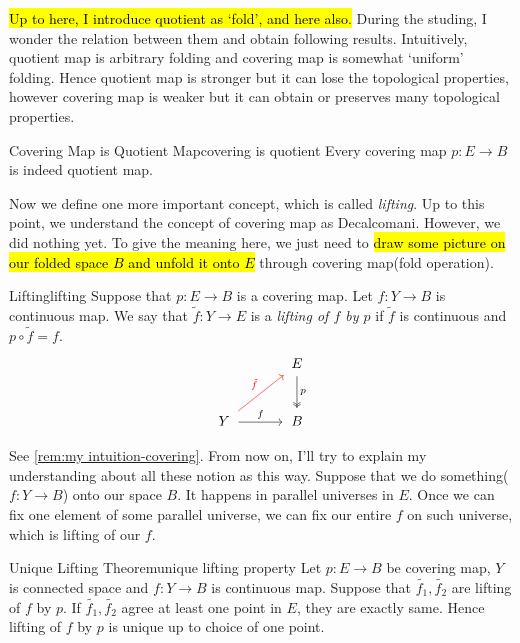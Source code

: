 \documentclass[12pt, a4paper, twoside]{article}
\theoremstyle{plain}
\begin{document}
\hl{Up to here, I introduce quotient as \lq fold', and here also.} 
During the studing, I wonder the relation between them and obtain following results. 
Intuitively, quotient map is arbitrary folding and covering map is somewhat \lq uniform' folding. 
Hence quotient map is stronger but it can lose the topological properties, however 
covering map is weaker but it can obtain or preserves many topological properties. 

\begin{rem}{Covering Map is Quotient Map}{covering is quotient}
    Every covering map $p: E \rightarrow B$ is indeed quotient map. 
\end{rem}

\newpage

Now we define one more important concept, which is called \textit{lifting}. 
Up to this point, we understand the concept of covering map as Decalcomani. However, 
we did nothing yet. To give the meaning here, we just need to \hl{draw some picture on our folded space $B$ and 
unfold it onto $E$} through covering map(fold operation). 

\begin{defn}{Lifting}{lifting}
    Suppose that $p: E \rightarrow B$ is a covering map. 
    Let $f: Y \rightarrow B$ is continuous map. 
    We say that $\tilde{f}: Y \rightarrow E$ is a \textit{lifting of $f$ by $p$} if 
    $\tilde{f}$ is continuous and $p \circ \tilde{f} = f$. 
    \[
    \begin{tikzcd}[row sep=large, column sep=large]
        & E \arrow[d, two heads, "p", shorten >= 2pt, shorten <= 2pt]\\
        Y \arrow[ru, red, "\tilde{f}", shorten >= 2pt, shorten <= 2pt] \arrow[r, "f", shorten >= 2pt, shorten <= 2pt] & B
    \end{tikzcd}
    \]
\end{defn}

See \ref{rem:my intuition-covering}. From now on, I'll try to explain my understanding about all these notion as this way. 
Suppose that we do something($f: Y \rightarrow B$) onto our space $B$. It happens in parallel universes in $E$. 
Once we can fix one element of some parallel universe, we can fix our entire $f$ on such universe, which is lifting of our $f$. 

\begin{thm}{Unique Lifting Theorem}{unique lifting property}
    Let $p: E \rightarrow B$ be covering map, $Y$ is connected space and $f: Y \rightarrow B$ is continuous map. 
    Suppose that $\tilde{f_1}, \tilde{f_2}$ are lifting of $f$ by $p$. 
    If $\tilde{f_1}, \tilde{f_2}$ agree at least one point in $E$, they are exactly same. 
    Hence lifting of $f$ by $p$ is unique up to choice of one point. 
\end{thm}
\end{document}
